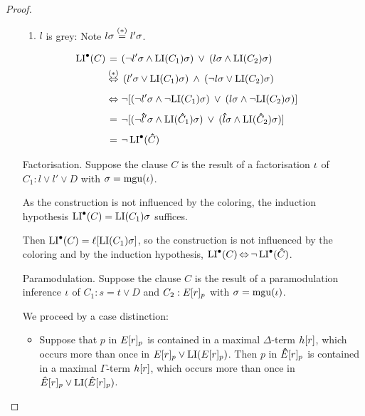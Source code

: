 \begin{proof}
\begin{itemize}
\begin{enumerate}
				\item $l$ is grey:
					Note ${l\sigma} \stackrel{{(*)}}= {l'\sigma}$.
					\begin{align*}
						\hspace*{\dimexpr-\leftmargini-\leftmarginii}
						\LIpre(C) &\stackrel{{\phantom{\markB}}}=
						(\lnot {{l'\sigma}} \land {\LI(C_1)\sigma}) \spam\lor 
						({l\sigma} \land {\LI(C_2)\sigma})\\
						&\stackrel{{\markB}}\semiff\,
						({{l'\sigma}} \lor {\LI(C_1)\sigma}) \spam\land 
						(\lnot {l\sigma} \lor {\LI(C_2)\sigma})\\
						&\stackrel{{\phantom{\markB}}}\semiff \lnot [ (\lnot {{l'\sigma}} \land \lnot {\LI(C_1)\sigma}) \spam\lor 
					({l\sigma} \land \lnot{\LI(C_2)\sigma}) ] \\
					&\stackrel{{\phantom{\markB}}}=\lnot [ (\lnot {{\bhat l'\sigma}} \land {\LI(\bhat C_1)\sigma}) \spam\lor 
				({\bhat l\sigma} \land {\LI(\bhat C_2)\sigma}) ]\\
				& \stackrel{{\phantom{\markB}}}= \lnot \LIpre(\bhat C) 
			\end{align*}
	\end{enumerate}


\item[Factorisation.]
	Suppose the clause $C$ is the result of a factorisation $\iota$ of $C_1: l \lor l' \lor D$ 
	with $\sigma = \operatorname{mgu}(\iota)$.

	As the construction is not influenced by the coloring, the induction hypothesis $\operatorname{LI}^\bullet(C) = \operatorname{LI}(C_1)\sigma$ suffices.

	Then $\operatorname{LI}^\bullet(C) = \ell[\operatorname{LI}(C_1)\sigma]$, so the construction is not influenced by the coloring and by the induction hypothesis, $\operatorname{LI}^\bullet(C) \operatorname{\Leftrightarrow} \lnot \operatorname{LI}^\bullet(\bm\hat C)$.

\item[Paramodulation.]
	Suppose the clause $C$ is the result of a paramodulation inference $\iota$ of $C_1: s=t \lor D$ and $C_2: E{[r]_{p}}$ with $\sigma=\operatorname{mgu}(\iota)$.


	We proceed by a case distinction:
	\begin{itemize}
		\item Suppose that $p$ in $E{[r]_{p}}$ is contained in a maximal $\Delta$-term $h[r]$, which occurs more than once in $E{[r]_{p}} \lor \operatorname{LI}(E{[r]_{p}})$. 
			Then $p$ in $\bm\hat E{[r]_{p}}$ is contained in a maximal $\Gamma$-term $h[r]$, which occurs more than once in $\bm\hat E{[r]_{p}} \lor \operatorname{LI}(\bm\hat E{[r]_{p}})$. 


\end{itemize}
\end{itemize}
\end{proof}
